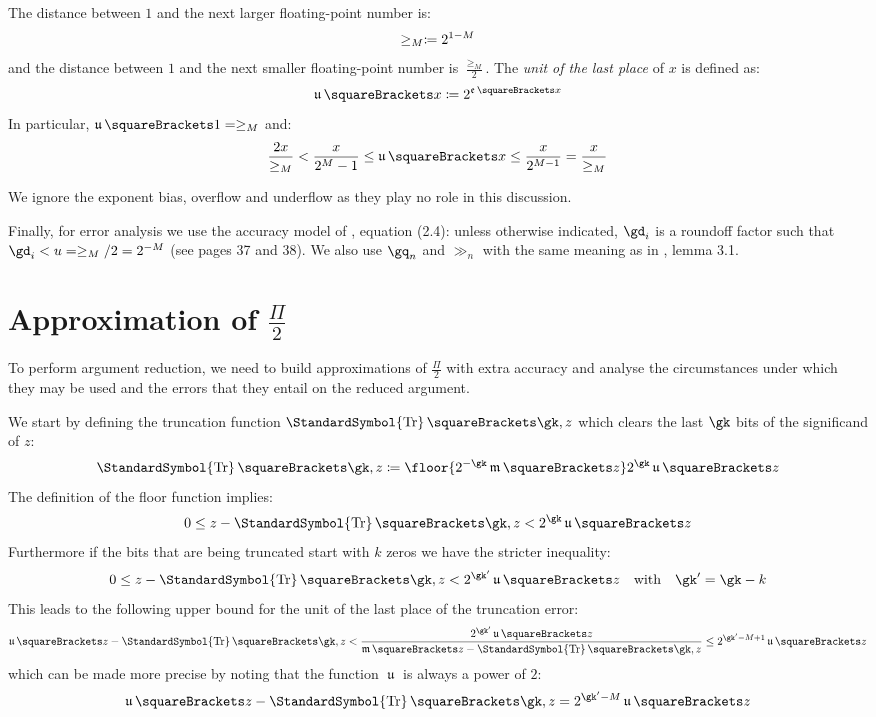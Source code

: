 \documentclass[10pt, a4paper, twoside]{basestyle}
\DeclareMathOperator{\ULP}{\mathfrak u}
\DeclareMathOperator{\mant}{\mathfrak m}
\DeclareMathOperator{\expn}{\mathfrak e}
\DeclareMathOperator{\truncate}{\StandardSymbol{Tr}}
\begin{document}
The distance between $1$ and the next larger floating-point number is:
\[
\ge_M \coloneq 2^{1-M}
\]
and the distance between $1$ and the next smaller floating-point number is $\frac{\ge_M}{2}$.
The \emph{unit of the last place} of $x$ is defined as:
\[
\ULP\of{x} \DefineAs 2^{\expn\of{x}}
\]
In particular, $\ULP\of{1} = \ge_M$ and:
\[
\frac{2 x}{\ge_M} < \frac{x}{2^M - 1} \leq \ULP\of{x} \leq \frac{x}{2^{M - 1}} = \frac{x}{\ge_M}
\]

We ignore the exponent bias, overflow and underflow as they play no role in this discussion.

Finally, for error analysis we use the accuracy model of \cite{Higham2002}, equation (2.4): unless otherwise indicated, $\gd_i$ is a roundoff factor such that $\gd_i < u = \ge_M / 2 = 2^{-M}$ (see pages 37 and 38).  We also use $\gq_n$ and $\gg_n$ with the same meaning as in \cite{Higham2002}, lemma 3.1.

\section*{Approximation of $\frac{\Pi}{2}$}
To perform argument reduction, we need to build approximations of $\frac{\Pi}{2}$ with extra accuracy and analyse the circumstances under which they may be used and the errors that they entail on the reduced argument.

We start by defining the truncation function $\truncate\of{\gk, z}$ which clears the last $\gk$ bits of the significand of $z$:
\[
\truncate\of{\gk, z} \DefineAs \floor{2^{-\gk} \mant \of{z}} 2^{\gk} \ULP\of{z}
\]
The definition of the floor function implies:
\[
0 \leq z - \truncate\of{\gk, z} < 2^{\gk} \ULP\of{z}
\]
Furthermore if the bits that are being truncated start with $k$ zeros we have the stricter inequality:
\begin{equation}
0 \leq z - \truncate\of{\gk, z} < 2^{\gk'} \ULP\of{z} \quad \text{with} \quad \gk' = \gk - k
\label{eqntruncerror}
\end{equation}
This leads to the following upper bound for the unit of the last place of the truncation error:
\[
\ULP\of{z - \truncate\of{\gk, z}} < \frac{2^{\gk'} \ULP\of{z}}{\mant\of{z - \truncate\of{\gk, z}}} \leq 2^{\gk' - M + 1} \ULP\of{z}
\]
which can be made more precise by noting that the function $\ULP$ is always a power of $2$:
\begin{equation}
\ULP\of{z - \truncate\of{\gk, z}} = 2^{\gk' - M} \ULP\of{z}
\label{eqnulptr}
\end{equation}
\end{document}
